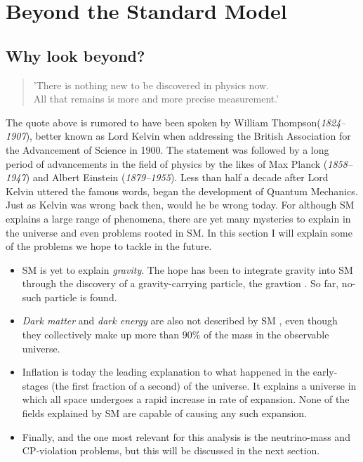 \section{Beyond the Standard Model}
\subsection{Why look beyond?}
\begin{center}
    \hyphenblockcquote{UKenglish}{Kelvin}{
        'There is nothing new to be discovered in physics now.\\
        All that remains is more and more precise measurement.'
        }
\end{center}
The quote above is rumored to have been spoken by William Thompson(\emph{1824–1907}), better
known as Lord Kelvin when addressing the British Association for the Advancement
of Science in 1900. The statement was followed by a long period of advancements in the
field of physics by the likes of Max Planck (\emph{1858–1947}) and 
Albert Einstein (\emph{1879–1955}). Less than half a decade after Lord Kelvin
uttered the famous words, began the development of Quantum Mechanics. 
Just as Kelvin was wrong back then, would he be wrong today. For although \ac{SM} explains 
a large range of phenomena, there are yet many mysteries to explain in the universe and even 
problems rooted in \ac{SM}. In this section I will explain some of the problems we hope to 
tackle in the future. 
\begin{itemize}
    \item \ac{SM} is yet to explain \emph{gravity}. The hope has been
    to integrate gravity into \ac{SM} through the discovery of a gravity-carrying particle, 
    the gravtion \cite{Graviton}. So far, no-such particle is found.
    \item \emph{Dark matter} and \emph{dark energy} are 
    also not described by \ac{SM} \cite{DarkME}, even though they collectively make up more than $90\%$ of the 
    mass in the observable universe.
    \item Inflation is today the leading explanation to what happened in the early-stages
    (the first fraction of a second) of the universe. It explains a universe in which all space
    undergoes a rapid increase in rate of expansion. None of the fields explained by \ac{SM} are 
    capable of causing any such expansion.
    \item Finally, and the one most relevant for this analysis is the
    neutrino-mass and \ac{CP}-violation problems, but this will be discussed in the next section.
\end{itemize}
